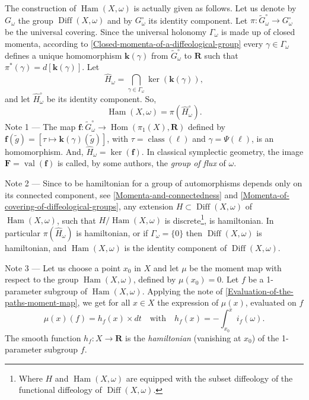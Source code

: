 \documentclass[10pt,reqno,twoside]{amsart}
\newcommand{\qmbox}[1]{\quad\mbox{#1}\quad}
\newcommand{\RR}{\mathbf{R}}
\DeclareMathOperator{\Diff}{Diff}
\DeclareMathOperator{\Hom}{Hom}
\DeclareMathOperator{\class}{class}
\DeclareMathOperator{\Values}{val}
\DeclareMathOperator{\Ham}{Ham}
\newcommand{\idGomega}{G_\omega^\circ}
\newcommand{\tidGomega}{\widetilde{G}_\omega^\circ}
\newcommand{\ek}{\mathbf{k}}
\newcommand{\ef}{\mathbf{f}}
\newcommand{\eF}{\mathbf{F}}
\theoremstyle{plain}
\theoremstyle{definition}
\begin{document}
  The construction of $\Ham(X,\omega)$ is actually given as follows.
  Let us denote by $G_\omega$ the group $\Diff(X,\omega)$ and by $\idGomega$ its identity component.
  Let $\pi : \tidGomega \to \idGomega$ be the universal covering.
  Since the universal holonomy $\Gamma_\omega$ is made up of closed momenta,
  according to \ref{Closed-momenta-of-a-diffeological-group} every $\gamma \in \Gamma_\omega$ defines a unique homomorphism $\ek(\gamma)$ from $\tidGomega$ to $\RR$ such that $\pi^*(\gamma) = d[\ek(\gamma)]$.
  Let
  $$
    \widehat H_\omega = \bigcap_{\gamma \in \Gamma_\omega} \ker(\ek(\gamma)),
    $$
  and let $\widehat H_\omega^\circ$ be its identity component.
  So,
  $$
    \Ham(X,\omega) = \pi(\widehat H_\omega^\circ).
    $$
  {\sc Note 1} --- The map $\ef : \tidGomega \to \Hom(\pi_1(X),\RR)$ defined by $\ef(\tilde g) = [ \tau \mapsto \ek(\gamma)(\tilde g)]$,
  with $\tau = \class(\ell)$ and $\gamma = \Psi(\ell)$,
  is an homomorphism.
  And,
  $\widehat H_\omega = \ker(\ef)$.
  In classical symplectic geometry,
  the image $\eF = \Values(\ef)$ is called,
  by some authors,
  the {\em group of flux} of $\omega$.
  
  {\sc Note 2} --- Since to be hamiltonian for a group of automorphisms depends only on its connected component,
  see \ref{Momenta-and-connectedness} and \ref{Momenta-of-covering-of-diffeological-groups},
  any extension $H \subset \Diff(X,\omega)$ of $\Ham(X,\omega)$,
  such that $H / \Ham(X,\omega)$ is discrete\footnote{Where $H$ and $\Ham(X,\omega)$ are equipped with the subset diffeology of the functional diffeology of $\Diff(X,\omega)$.},
  is hamiltonian.
  In particular $\pi(\widehat H_\omega)$ is hamiltonian,
  or if $\Gamma_\omega = \{0\}$ then $\Diff(X,\omega)$ is hamiltonian,
  and $\Ham(X,\omega)$ is the identity component of $\Diff(X,\omega)$.
  
  {\sc Note 3} --- Let us choose a point $x_0$ in $X$ and let $\mu$ be the moment map with respect to the group $\Ham(X,\omega)$,
  defined by $\mu(x_0) = 0$.
  Let $f$ be a 1-parameter subgroup of $\Ham(X,\omega)$.
  Applying the note of \ref{Evaluation-of-the-paths-moment-map},
  we get for all $x \in X$ the expression of $\mu(x)$,
  evaluated on $f$
  $$
    \mu(x)(f) = h_f(x) \times dt \qmbox{with} h_f(x) = - \int_{x_0}^x i_f(\omega).
    $$
  The smooth function $h_f : X \to \RR$ is the {\em hamiltonian} (vanishing at $x_0$) of the 1-parameter subgroup $f$.
  
\end{document}

